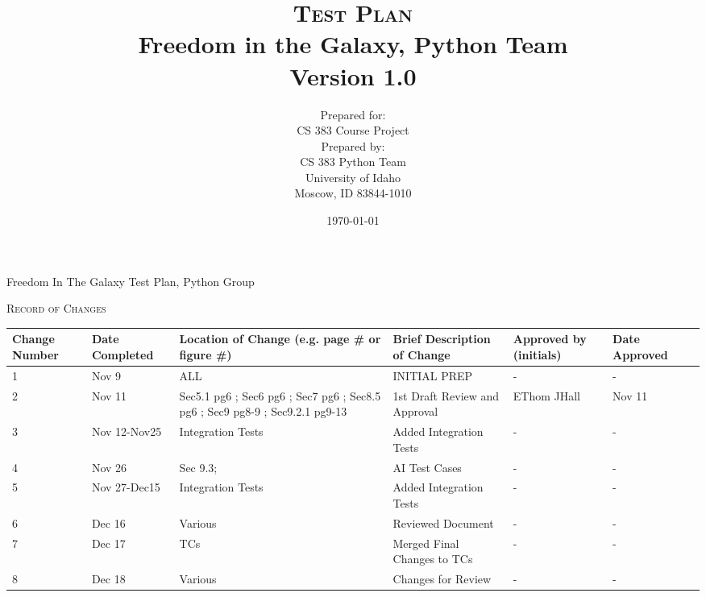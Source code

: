 \documentclass[report]{article}
\begin{document}
\title{\textsc{Test Plan}
  \\ Freedom in the Galaxy, Python Team
  \vspace{10 mm}
  \\ Version 1.0
  \vspace{10 mm}}
  
\date{\today}

\author{Prepared for:
  \\ CS 383 Course Project
  \vspace{10 mm}
  \\Prepared by:
  \\ CS 383 Python Team
  \\ University of Idaho
  \\ Moscow, ID 83844-1010
  \vspace{10 mm}}


\maketitle
\newpage 

\begin{center}
\noindent Freedom In The Galaxy Test Plan, Python Group

\vspace{10 mm}

\noindent \textsc{Record of Changes}   

\vspace{10 mm}


\begin{tabularx}{\textwidth}{| X | X | X | X | X | X | X |}
  \hline
  \textbf{Change Number} &
    \textbf{Date Completed} &
    \textbf{Location of Change (e.g. page \# or figure \#)} &
    \textbf{Brief Description of Change} &
    \textbf{Approved by (initials)} &
    \textbf{Date Approved} 
    \\ \hline 1 & Nov 9 & ALL  & INITIAL PREP & - & -
    \\ \hline 2 & Nov 11 & Sec5.1 pg6 ; Sec6 pg6 ; Sec7 pg6 ; Sec8.5 pg6 ; Sec9 pg8-9 ; Sec9.2.1 pg9-13 & 1st Draft Review and Approval & EThom JHall & Nov 11  
    \\ \hline 3 & Nov 12-Nov25 & Integration Tests & Added Integration Tests & - & -
    \\ \hline 4 & Nov 26 & Sec 9.3;  & AI Test Cases & - & -
    \\ \hline 5 & Nov 27-Dec15 & Integration Tests & Added Integration Tests & - & -
    \\ \hline 6 & Dec 16 & Various & Reviewed Document & - & -
    \\ \hline 7 & Dec 17 & TCs & Merged Final Changes to TCs & - & -
    \\ \hline 8 & Dec 18 & Various & Changes for Review & - & -

    \\ \hline
\end{tabularx}
\end{center}
\newpage 
\tableofcontents
\newpage
\end{document}
